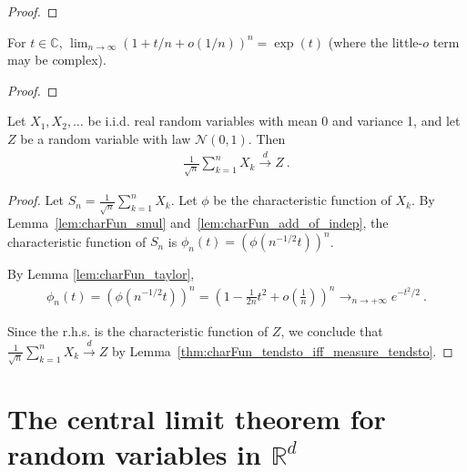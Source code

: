 \begin{proof}\leanok
{}
\end{proof}

\begin{lemma}\label{lem:tendsto_one_plus_div_pow_exp}
\leanok
{}
For $t\in\mathbb{C}$, $\lim_{n\to\infty}(1+t/n+o(1/n))^n=\exp(t)$ (where the little-$o$ term may be complex).
\end{lemma}

\begin{proof}\leanok
\end{proof}

\begin{theorem}\label{thm:clt}
    \leanok
Let $X_1, X_2, \ldots$ be i.i.d. real random variables with mean 0 and variance 1, and let $Z$ be a random variable with law $\mathcal N(0,1)$. Then
\begin{align*}
\frac{1}{\sqrt{n}}\sum_{k=1}^n X_k \xrightarrow{d} Z \: .
\end{align*}
\end{theorem}

\begin{proof}
\leanok
Let $S_n = \frac{1}{\sqrt{n}}\sum_{k=1}^n X_k$. Let $\phi$ be the characteristic function of $X_k$. By Lemma~\ref{lem:charFun_smul} and~\ref{lem:charFun_add_of_indep}, the characteristic function of $S_n$ is $\phi_n(t) = (\phi(n^{-1/2}t))^n$.

By Lemma \ref{lem:charFun_taylor},
\begin{align*}
\phi_n(t) = (\phi(n^{-1/2}t))^n = \left(1 - \frac{1}{2n}t^2 + o(\frac{1}{n})\right)^n \to_{n \to +\infty} e^{-t^2/2} \: .
\end{align*}

Since the r.h.s. is the characteristic function of $Z$, we conclude that $\frac{1}{\sqrt{n}}\sum_{k=1}^n X_k \xrightarrow{d} Z$ by Lemma~\ref{thm:charFun_tendsto_iff_measure_tendsto}.
\end{proof}


\section{The central limit theorem for random variables in $\mathbb{R}^d$}

